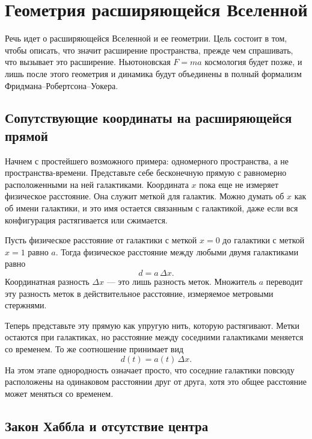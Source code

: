 \chapter{Геометрия расширяющейся Вселенной}

Речь идет о расширяющейся Вселенной и ее геометрии. Цель состоит в том, чтобы описать, что значит расширение пространства, прежде чем спрашивать, что вызывает это расширение. Ньютоновская \(F=ma\) космология будет позже, и лишь после этого геометрия и динамика будут объединены в полный формализм Фридмана--Робертсона--Уокера.

\section{Сопутствующие координаты на расширяющейся прямой}

Начнем с простейшего возможного примера: одномерного пространства, а не пространства-времени. Представьте себе бесконечную прямую с равномерно расположенными на ней галактиками. Координата \(x\) пока еще не измеряет физическое расстояние. Она служит меткой для галактик. Можно думать об \(x\) как об имени галактики, и это имя остается связанным с галактикой, даже если вся конфигурация растягивается или сжимается.

Пусть физическое расстояние от галактики с меткой \(x=0\) до галактики с меткой \(x=1\) равно \(a\). Тогда физическое расстояние между любыми двумя галактиками равно
\begin{equation}
d=a\,\Delta x.
\end{equation}
Координатная разность \(\Delta x\) — это лишь разность меток. Множитель \(a\) переводит эту разность меток в действительное расстояние, измеряемое метровыми стержнями.

Теперь представьте эту прямую как упругую нить, которую растягивают. Метки остаются при галактиках, но расстояние между соседними галактиками меняется со временем. То же соотношение принимает вид
\begin{equation}
d(t)=a(t)\,\Delta x.
\end{equation}
На этом этапе однородность означает просто, что соседние галактики повсюду расположены на одинаковом расстоянии друг от друга, хотя это общее расстояние может меняться со временем.

\section{Закон Хаббла и отсутствие центра}

